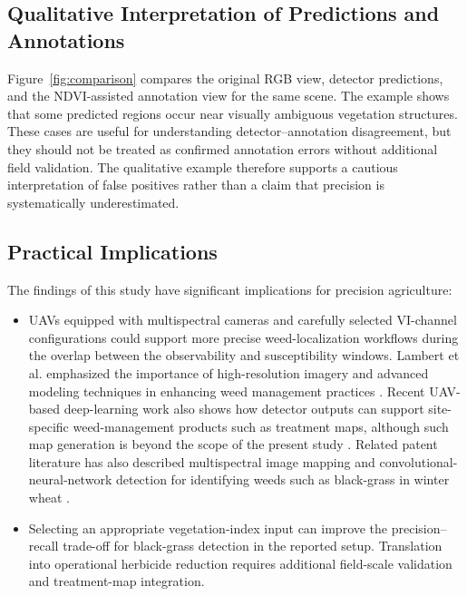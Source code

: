 \documentclass{ieeeaccess}
\begin{document}
\subsection{Qualitative Interpretation of Predictions and Annotations}

Figure~\ref{fig:comparison} compares the original RGB view, detector predictions, and the NDVI-assisted annotation view for the same scene. The example shows that some predicted regions occur near visually ambiguous vegetation structures. These cases are useful for understanding detector--annotation disagreement, but they should not be treated as confirmed annotation errors without additional field validation. The qualitative example therefore supports a cautious interpretation of false positives rather than a claim that precision is systematically underestimated.



\subsection{Practical Implications}
The findings of this study have significant implications for precision agriculture:

\begin{itemize}
    \item UAVs equipped with multispectral cameras and carefully selected VI-channel configurations could support more precise weed-localization workflows during the overlap between the observability and susceptibility windows. Lambert et al. emphasized the importance of high-resolution imagery and advanced modeling techniques in enhancing weed management practices \cite{lambert_testing_2019}. Recent UAV-based deep-learning work also shows how detector outputs can support site-specific weed-management products such as treatment maps, although such map generation is beyond the scope of the present study \cite{mesias_ruiz_multispecies_2026}. Related patent literature has also described multispectral image mapping and convolutional-neural-network detection for identifying weeds such as black-grass in winter wheat \cite{hallosta_weed_patent_2025}.
    \item Selecting an appropriate vegetation-index input can improve the precision--recall trade-off for black-grass detection in the reported setup. Translation into operational herbicide reduction requires additional field-scale validation and treatment-map integration.
\end{itemize}
\end{document}
